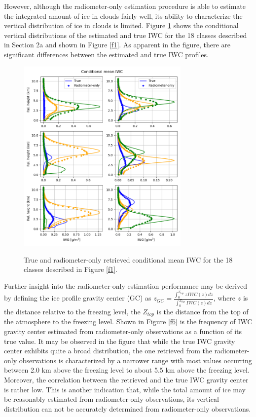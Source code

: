 \documentclass{ametsocV6.1}
\begin{document}
However, although the radiometer-only estimation procedure is able to estimate the integrated amount of ice in clouds fairly
well, its ability to characterize the vertical distribution of ice in clouds is limited.  Figure \ref{f5} shows the conditional vertical distributions of the estimated and true IWC for the 18 classes described in Section 2a and shown in Figure \ref{f1}. As apparent in the figure, there are significant differences between the estimated and true IWC profiles. 
\begin{figure}[t]
    \centering
    \includegraphics[width=0.75\textwidth,angle=0]{fig05.rev.png}\\
    \caption{True and radiometer-only retrieved conditional mean IWC for the 18 classes described in 
    Figure \ref{f1}.}\label{f5}
\end{figure}

Further insight into the radiometer-only estimation performance may be derived by defining the ice profile gravity center (GC) as $z_{GC}=\frac {\int_0^{Z_{top}}zIWC(z)dz} {\int_0^{Z_{top}}IWC(z)dz}$, where $z$ is the distance relative to the freezing level, the $Z_{top}$ is the distance from the top of the atmosphere to the freezing level. Shown in Figure \ref{f6} is the frequency of IWC gravity center estimated from radiometer-only observations as a function of its true value.  It may be observed in the figure that while the true IWC gravity center exhibits quite a broad distribution, the one retrieved from the radiometer-only observations is characterized by a narrower range with most values occurring between 2.0 km above the freezing level to about 5.5 km above the freezing level. Moreover, the correlation between the retrieved and the true IWC gravity center is rather low.  This is another indication that, while the total amount of ice may be reasonably estimated from radiometer-only observations, its vertical distribution can not be accurately determined from radiometer-only observations.
\end{document}
